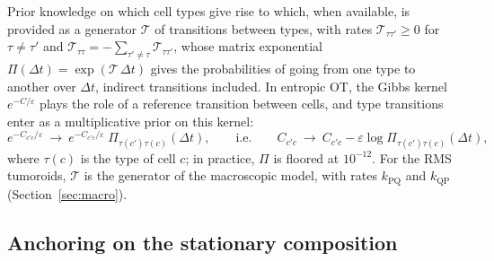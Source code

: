 \documentclass[a4paper, 11pt]{article}
\newcommand{\Tg}{\mathcal{T}}
\newcommand{\cP}{\mathrm{P}}
\newcommand{\cQ}{\mathrm{Q}}
\theoremstyle{plain}
\theoremstyle{remark}
\begin{document}
Prior knowledge on which cell types give rise to which, when available, is provided as a generator $\Tg$ of transitions between types, with rates $\Tg_{\tau\tau'} \geq 0$ for $\tau \neq \tau'$ and $\Tg_{\tau\tau} = -\sum_{\tau'\neq\tau}\Tg_{\tau\tau'}$, whose matrix exponential $\Pi(\Delta t) = \exp(\Tg\,\Delta t)$ gives the probabilities of going from one type to another over $\Delta t$, indirect transitions included. In entropic OT, the Gibbs kernel $e^{-C/\varepsilon}$ plays the role of a reference transition between cells, and type transitions enter as a multiplicative prior on this kernel:
\begin{equation}\label{eq:transition}
e^{-C_{c'c}/\varepsilon}\ \longrightarrow\ e^{-C_{c'c}/\varepsilon}\;\Pi_{\tau(c')\tau(c)}(\Delta t),
\qquad\text{i.e.}\qquad
C_{c'c}\ \longrightarrow\ C_{c'c} - \varepsilon\log\Pi_{\tau(c')\tau(c)}(\Delta t),
\end{equation}
where $\tau(c)$ is the type of cell $c$; in practice, $\Pi$ is floored at $10^{-12}$. For the RMS tumoroids, $\Tg$ is the generator of the macroscopic model, with rates $k_{\cP\cQ}$ and $k_{\cQ\cP}$ (Section~\ref{sec:macro}).

\subsection{Anchoring on the stationary composition}\label{sec:anchor}
\end{document}

